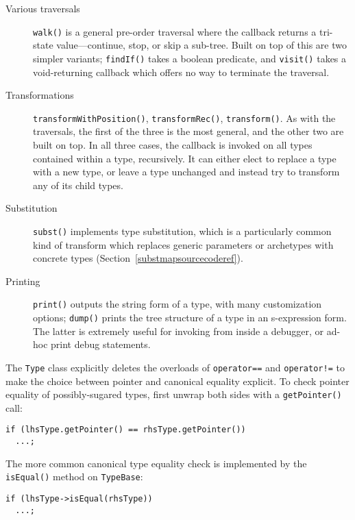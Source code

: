 \documentclass[a4paper,headsepline,bibliography=totoc,toc=flat,fleqn,twoside=semi]{scrbook}
\theoremstyle{definition}
\theoremstyle{definition}
\theoremstyle{definition}
\begin{document}
\begin{description}
\item[Various traversals] \texttt{walk()} is a general pre-order traversal where the callback returns a tri-state value---continue, stop, or skip a sub-tree. Built on top of this are two simpler variants; \texttt{findIf()} takes a boolean predicate, and \texttt{visit()} takes a void-returning callback which offers no way to terminate the traversal.
\item[Transformations] \texttt{transformWithPosition()}, \texttt{transformRec()}, \texttt{transform()}. As with the traversals, the first of the three is the most general, and the other two are built on top. In all three cases, the callback is invoked on all types contained within a type, recursively. It can either elect to replace a type with a new type, or leave a type unchanged and instead try to transform any of its child types.
\item[Substitution] \texttt{subst()} implements type substitution, which is a particularly common kind of transform which replaces generic parameters or archetypes with concrete types (Section~\ref{substmapsourcecoderef}).
\item[Printing] \texttt{print()} outputs the string form of a type, with many customization options; \texttt{dump()} prints the tree structure of a type in an s-expression form. The latter is extremely useful for invoking from inside a debugger, or ad-hoc print debug statements.
\end{description}
The \texttt{Type} class explicitly deletes the overloads of \texttt{operator==} and \texttt{operator!=} to make the choice between pointer and canonical equality explicit. To check pointer equality of possibly-sugared types, first unwrap both sides with a \texttt{getPointer()} call:
\begin{Verbatim}
if (lhsType.getPointer() == rhsType.getPointer())
  ...;
\end{Verbatim}
The more common canonical type equality check is implemented by the \texttt{isEqual()} method on \texttt{TypeBase}:
\begin{Verbatim}
if (lhsType->isEqual(rhsType))
  ...;
\end{Verbatim}
\end{document}
